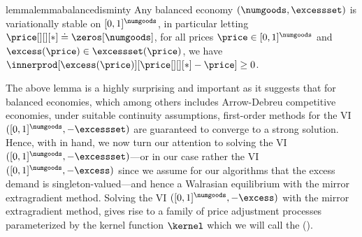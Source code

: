 \begin{restatable}{lemma}{lemmabalancedisminty}\label{lemma:balanced_is_minty}
     Any balanced economy $(\numgoods, \excessset)$ is variationally stable on $[0, 1]^\numgoods$, in particular letting $\price[][][*] \doteq \zeros[\numgoods]$, for all prices $\price \in [0, 1]^\numgoods$ and $\excess(\price) \in \excessset(\price)$, we have $
        \innerprod[{ \excess(\price)}][{\price[][][*] - \price}] \geq 0$.
\end{restatable}




The above lemma is a highly surprising and important as it suggests that for balanced economies, which among others includes Arrow-Debreu competitive economies, under suitable continuity assumptions, first-order methods for the VI $([0, 1]^\numgoods, -\excessset)$ are guaranteed to converge to a strong solution. 
Hence, with  in hand, we now turn our attention to solving the VI $([0, 1]^\numgoods, -\excessset)$---or in our case rather the VI $([0, 1]^\numgoods, -\excess)$ since we assume for our algorithms that the excess demand is singleton-valued---and hence a Walrasian equilibrium with the mirror extragradient method. Solving the VI $([0, 1]^\numgoods, -\excess)$ with the mirror extragradient method, gives rise to a family of price adjustment processes parameterized by the kernel function $\kernel$ which we will call the  ().



